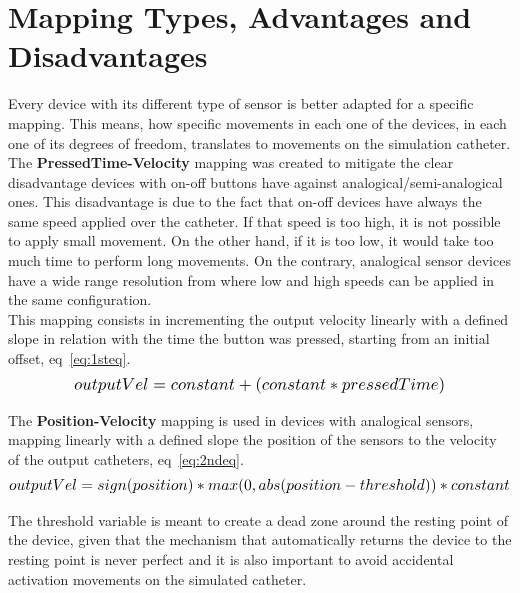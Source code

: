 \section{Mapping Types, Advantages and Disadvantages}\label{sec:mapping}
Every device with its different type of sensor is better adapted for a specific mapping. This means, how specific movements in each one of the devices, in each one of its degrees of freedom, translates to movements on the simulation catheter.\\

The \textbf{PressedTime-Velocity} mapping was created to mitigate the clear disadvantage devices with on-off buttons have against analogical/semi-analogical ones. This disadvantage is due to the fact that on-off devices have always the same speed applied over the catheter. If that speed is too high, it is not possible to apply small movement. On the other hand, if it is too low, it would take too much time to perform long movements. On the contrary, analogical sensor devices have a wide range resolution from where low and high speeds can be applied in the same configuration.\\

This mapping consists in incrementing the output velocity linearly with a defined slope in relation with the time the button was pressed, starting from an initial offset, eq~\ref{eq:1steq}.\\

\begin{equation}
   \scalebox{1.2}{$outputVel=constant+(constant*pressedTime)$}
   \centering
   \label{eq:1steq}
\end{equation}

The \textbf{Position-Velocity} mapping is used in devices with analogical sensors, mapping linearly with a defined slope the position of the sensors to the velocity of the output catheters, eq~\ref{eq:2ndeq}.\\

\begin{equation}
   \scalebox{1.2}{$outputVel=sign(position)*max(0,abs(position-threshold))*constant$}
   \centering
   \label{eq:2ndeq}
\end{equation}

The threshold variable is meant to create a dead zone around the resting point of the device, given that the mechanism that automatically returns the device to the resting point is never perfect and it is also important to avoid accidental activation movements on the simulated catheter.\\


